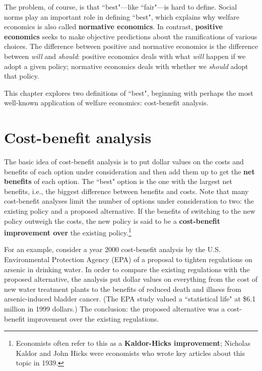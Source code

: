 The problem, of course, is that ``best"---like ``fair"---is hard to define. Social norms play an important role in defining ``best", which explains why welfare economics is also called \textbf{normative economics}. In contrast, \textbf{positive economics} seeks to make objective predictions about the ramifications of various choices. The difference between positive and normative economics is the difference between \emph{will} and \emph{should}: positive economics deals with what \emph{will} happen if we adopt a given policy; normative economics deals with whether we \emph{should} adopt that policy.

This chapter explores two definitions of ``best", beginning with perhaps the most well-known application of welfare economics: cost-benefit analysis.







\section{Cost-benefit analysis}

The basic idea of cost-benefit analysis is to put dollar values on the costs and benefits of each option under consideration and then add them up to get the \textbf{net benefits} of each option. The ``best" option is the one with the largest net benefits, i.e., the biggest difference between benefits and costs. Note that many cost-benefit analyses limit the number of options under consideration to two: the existing policy and a proposed alternative. If the benefits of switching to the new policy outweigh the costs, the new policy is said to be a \textbf{cost-benefit improvement over} the existing policy.\footnote{Economists often refer to this as a \textbf{Kaldor-Hicks improvement}; Nicholas Kaldor and John Hicks were economists who wrote key articles about this topic in 1939.}

For an example, consider a year 2000 cost-benefit analysis by the U.S. Environmental Protection Agency (EPA) of a proposal to tighten regulations on arsenic in drinking water. In order to compare the existing regulations with the proposed alternative, the analysis put dollar values on everything from the cost of new water treatment plants to the benefits of reduced death and illness from arsenic-induced bladder cancer. (The EPA study valued a ``statistical life" at \$6.1 million in 1999 dollars.) The conclusion: the proposed alternative was a cost-benefit improvement over the existing regulations.

